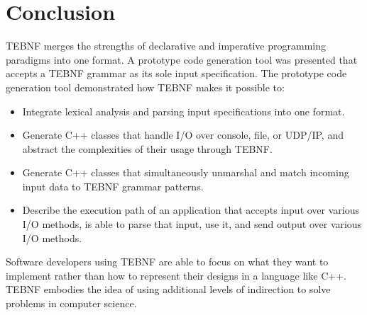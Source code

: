\chapter{Conclusion}
TEBNF merges the strengths of declarative and imperative programming paradigms into one format.  A prototype code generation tool was presented that accepts a TEBNF grammar as its sole input specification.  The prototype code generation tool demonstrated how TEBNF makes it possible to:
\begin{itemize}
  \item Integrate lexical analysis and parsing input specifications into one format.
  \item Generate C++ classes that handle I/O over console, file, or UDP/IP, and abstract the complexities of their usage through TEBNF.
  \item Generate C++ classes that simultaneously unmarshal and match incoming input data to TEBNF grammar patterns.
  \item Describe the execution path of an application that accepts input over various I/O methods, is able to parse that input, use it, and send output over various I/O methods.
\end{itemize}

\indent
Software developers using TEBNF are able to focus on what they want to implement rather than how to represent their designs in a language like C++.  TEBNF embodies the idea of using additional levels of indirection to solve problems in computer science.
